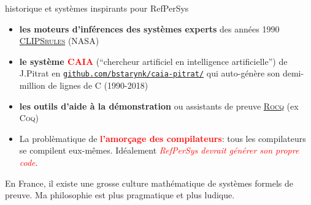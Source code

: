 \documentclass[final,a4,xcolor={svgnames,dvipsnames}]{beamer}
\begin{document}
 \begin{frame}{historique et systèmes inspirants pour RefPerSys}

   \begin{itemize}

   \item \textbf{les moteurs d'inférences des systèmes experts} des années 1990
     \href{https://clipsrules.net/}{\textsc{CLIPSrules}} (NASA)

   \item \textbf{le système \textcolor{red}{CAIA}} (``chercheur
     artificiel en intelligence artificielle'') de J.Pitrat en
     {\texttt{\href{https://github.com/bstarynk/caia-pitrat}{github.com/bstarynk/caia-pitrat/}}}
     qui auto-génère son demi-million de lignes de C (1990-2018)
     
   \item \textbf{les outils d'aide à la démonstration} ou assistants
     de preuve \href{https://rocq-prover.org/}{\textsc{Rocq}} (ex
     \textsc{Coq})

     \item La problèmatique de \textbf{\textcolor{red}{l'amorçage des
         compilateurs}}: tous les compilateurs se compilent
       eux-mêmes. Idéalement \textit{\textcolor{red}{RefPerSys devrait générer son
         propre code}}.
   \end{itemize}

   \bigskip

   En France, il existe une grosse culture mathématique de systèmes
   formels de preuve. Ma philosophie est plus pragmatique et plus ludique.
   
 \end{frame}
 
\end{document}
